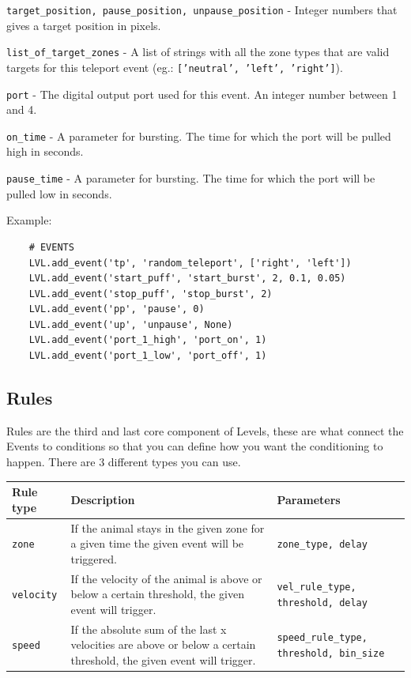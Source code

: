 \documentclass[11pt,a4paper]{article}
\newcommand{\param}[1]{\item \texttt{#1} -}
\begin{document}
\begin{paramlist}
\param{target\_position, pause\_position, unpause\_position} Integer numbers that gives a target position in pixels.
\param{list\_of\_target\_zones} A list of strings with all the zone types that are valid targets for this teleport event (eg.: \texttt{['neutral', 'left', 'right']}).
\param{port} The digital output port used for this event. An integer number between 1 and 4.
\param{on\_time} A parameter for bursting. The time for which the port will be pulled high in seconds.
\param{pause\_time} A parameter for bursting. The time for which the port will be pulled low in seconds.
\end{paramlist}


Example:
\begin{lstlisting}
	# EVENTS
	LVL.add_event('tp', 'random_teleport', ['right', 'left'])
	LVL.add_event('start_puff', 'start_burst', 2, 0.1, 0.05)
	LVL.add_event('stop_puff', 'stop_burst', 2)
	LVL.add_event('pp', 'pause', 0)
	LVL.add_event('up', 'unpause', None)
	LVL.add_event('port_1_high', 'port_on', 1)
	LVL.add_event('port_1_low', 'port_off', 1)
\end{lstlisting}

\subsection{Rules \label{sec:rules}}
Rules are the third and last core component of Levels, these are what connect the Events to conditions so that you can define how you want the conditioning to happen. There are 3 different types you can use.\\


\begin{tabularx}{\textwidth}{|p{3.1cm}|X|p{4cm}|}
\hline 
\rule[-1ex]{0pt}{2.5ex} 
Rule type & Description & Parameters \\ 

\hline 
\rule[-1ex]{0pt}{2.5ex} 
\texttt{zone} & If the animal stays in the given zone for a given time the given event will be triggered. & \texttt{zone\_type, delay} \\ 

\hline 
\rule[-1ex]{0pt}{2.5ex} 
\texttt{velocity} & If the velocity of the animal is above or below a certain threshold, the given event will trigger. & \texttt{vel\_rule\_type, threshold, delay} \\ 

\hline 
\rule[-1ex]{0pt}{2.5ex} 
\texttt{speed} & If the absolute sum of the last x velocities are above or below a certain threshold, the given event will trigger. & \texttt{speed\_rule\_type, threshold, bin\_size} \\ 

\hline 
\end{tabularx}
\\
\end{document}
